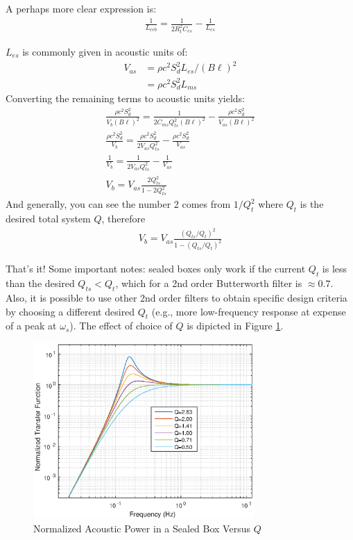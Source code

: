 \documentclass[10pt,letterpaper]{book}
\begin{document}
A perhaps more clear expression is:
\begin{align}
\frac{1}{L_{ceb}}=\frac{1}{2R_{t}^2C_{es}}-\frac{1}{L_{es}}
\end{align}

$L_{es}$ is commonly given in acoustic units of:
\begin{align}
V_{as}&=\rho c^2 S_d^2 L_{es}/(B\ell)^2\\
&=\rho c^2 S_d^2 L_{ms}
\end{align}
Converting the remaining terms to acoustic units yields:
\begin{align}
\frac{\rho c^2 S_d^2}{V_{b} (B\ell)^2}=\frac{1}{2C_{ms}Q_{ts}^2(B\ell)^2}
-\frac{\rho c^2 S_d^2}{V_{as} (B\ell)^2}\\
\frac{\rho c^2 S_d^2}{V_{b}}=\frac{\rho c^2 S_d^2}{2V_{as}Q_{ts}^2}
-\frac{\rho c^2 S_d^2}{V_{as}}\\
\frac{1}{V_{b}}=\frac{1}{2V_{as}Q_{ts}^2}
-\frac{1}{V_{as}}\\
V_{b}=V_{as}\frac{2Q_{ts}^2}{1-2Q_{ts}^2}
\end{align}
And generally, you can see the number 2 comes from $1/Q_t^2$ where $Q_t$ is the desired total system $Q$, therefore
\begin{align}
V_{b}=V_{as}\frac{(Q_{ts}/Q_{t})^2}{1-(Q_{ts}/Q_{t})^2}
\end{align}

That's it! Some important notes: sealed boxes only work if the current $Q_{t}$ is less than the desired $Q_{ts}<Q_{t}$, which for a 2nd order Butterworth filter is $\approx 0.7$. Also, it is possible to use other 2nd order filters to obtain specific design criteria by choosing a different desired $Q_{t}$ (e.g., more low-frequency response at expense of a peak at $\omega_s$). The effect of choice of $Q$ is dipicted in Figure \ref{fig:sealedBoxQ}.

\begin{figure}
\centering
\includegraphics[width=0.75\textwidth]{matlab/sealedBoxQ.eps}
\caption{Normalized Acoustic Power in a Sealed Box Versus $Q$}\label{fig:sealedBoxQ}
\end{figure}
\end{document}

